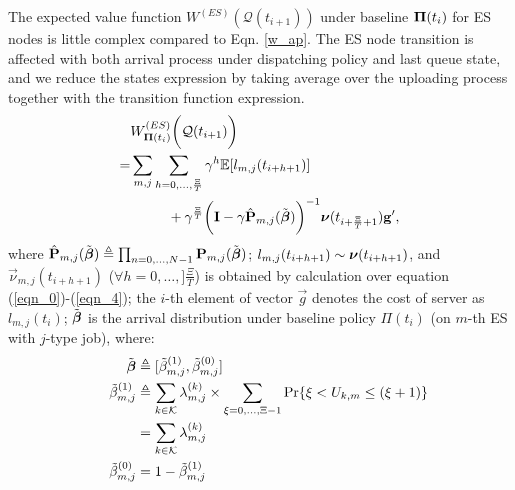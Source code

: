 The expected value function $W^{(ES)}(\mathcal{Q}(t_{i+1}))$ under baseline $\boldsymbol{\Pi}(t_{i})$ for ES nodes is little complex compared to Eqn. \ref{w_ap}.
The ES node transition is affected with both arrival process under dispatching policy and last queue state, and we reduce the states expression by taking average over the uploading process together with the transition function expression.
\begin{align}
    &W^{(ES)}_{\BaseLine(t_i)}\Paren{\mathcal{Q}(t_{i+1})} %
    \nonumber\\
    =& \sum_{m,j}\sum_{h=0,\dots,\frac{\Xi}{T}} \gamma^{h} \mathbb{E}[ l_{m,j}(t_{i+h+1}) ]
    \nonumber\\
    &~~~~~~~~+ \gamma^{\frac{\Xi}{T}} \Paren{ \mat{I} - \gamma \hat{\mat{P}}_{m,j}(\tilde{\vecG{\beta}}) }^{-1} \vecG{\nu}(t_{i+\frac{\Xi}{T}+1}) \vec{g}',
\end{align}
where $\hat{\mathbf{P}}_{m,j}(\tilde{\boldsymbol{\beta}}) \triangleq \prod_{n=0,\dots,N-1} \mathbf{P}_{m,j}(\tilde{\boldsymbol{\beta}})$;
$l_{m,j}(t_{i+h+1}) \sim \boldsymbol{\nu}(t_{i+h+1})$, and $\vec{\nu}_{m,j}(t_{i+h+1})$ ($\forall h=0,\dots,]\frac{\Xi}{T}$) is obtained by calculation over equation (\ref{eqn_0})-(\ref{eqn_4});
the $i$-th element of vector $\vec{g}$ denotes the cost of server as $l_{m,j}(t_i)$;
$\tilde{\boldsymbol{\beta}}$ is the arrival distribution under baseline policy $\Pi(t_{i})$ (on $m$-th ES with $j$-type job), where:
\begin{align}
    ~~~~\tilde{\boldsymbol{\beta}} &\triangleq [\tilde{\beta}^{(1)}_{m,j}, \tilde{\beta}^{(0)}_{m,j}]
    \\
    ~~~~\tilde{\beta}^{(1)}_{m,j} &\triangleq \sum_{k\in\mathcal{K}} \lambda^{(k)}_{m,j} \times \sum_{\xi=0,\dots,\Xi-1} \Pr\{ \xi<U_{k,m}\leq(\xi+1) \}
        \nonumber\\
    ~~~~&= \sum_{k\in\mathcal{K}} \lambda^{(k)}_{m,j}
    \\
    ~~~~\tilde{\beta}^{(0)}_{m,j} &= 1 - \tilde{\beta}^{(1)}_{m,j}
\end{align}


